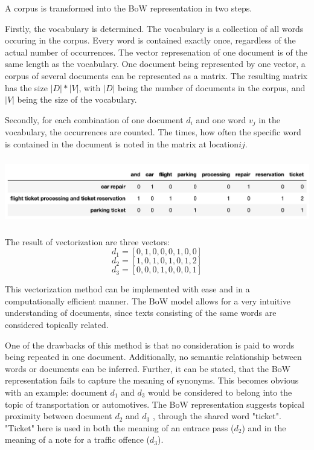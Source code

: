             A corpus is transformed into the \ac{BoW} representation in two steps. 
            
            Firstly, the vocabulary is determined. 
            The vocabulary is a collection of all words occuring in the corpus. Every word is contained exactly once, regardless of the actual number of occurrences. The vector represenation of one document is of the same length as the vocabulary. One document being represented by one vector, a corpus of several documents can be represented as a matrix. The resulting matrix has the size $ |D|*|V| $, with $|D|$ being the number of documents in the corpus, and $|V|$ being the size of the vocabulary.
            
            Secondly, for each combination of one document $ d_{i} $ and one word $ v_{j} $ in the vocabulary, the occurrences are counted. The times, how often the specific word is contained in the document is noted in the matrix at location$  ij $.
            
            \includegraphics[height=2.9cm]{Bilder/bow.png}
    
            The result of vectorization are three vectors:
            \[ d_{1} = [0,1,0,0,0,1,0,0] \]
            \[ d_{2} = [1,0,1,0,1,0,1,2] \]	
            \[ d_{3} = [0,0,0,1,0,0,0,1]\]
    
    
            This vectorization method can be implemented with ease and in a computationally efficient manner. The \ac{BoW} model allows for a very intuitive understanding of documents, since texts consisting of the same words are considered topically related. 
            
            One of the drawbacks of this method is that no consideration is paid to words being repeated in one document. Additionally, no semantic relationship between words or documents can be inferred. 
            Further, it can be stated, that the \ac{BoW} representation fails to capture the meaning of synonyms. This becomes obvious with an example: document $ d_{1} $ and $ d_{3}$ would be considered to belong into the topic of transportation or automotives. The \ac{BoW} representation suggests topical proximity between document $ d_{2} $ and $ d_{3}$ , through the shared word "ticket". "Ticket" here is used in both the meaning of an entrace pass ($d_{2}$) and in the meaning of a note for a traffic offence  ($d_{3}$). 
            

